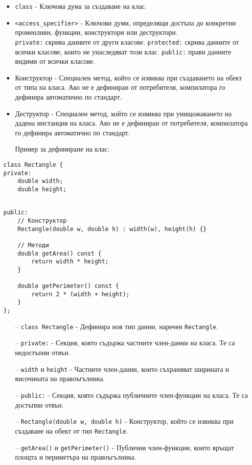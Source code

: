 \documentclass[oneside]{book}
\newcommand*{\code}[1]{\texttt{#1}}
\begin{document}
\begin{itemize}
    \item \code{class} - Ключова дума за създаване на клас.
    \item \code{<access\_specifier>} - Ключови думи, определящи достъпа до конкретни променливи, функции, конструктори или деструктори.\\\code{private:} скрива данните от други класове. \code{protected:} скрива данните от всички класове, които не унаследяват този клас. \code{public:} прави данните видими от всички класове.
    \item Конструктор - Специален метод, който се извиква при създаването на обект от типа на класа. Ако не е дефиниран от потребителя, компилатора го дефинира автоматично по стандарт.
    \item Деструктор - Специален метод, който се извиква при унищожаването на дадена инстанция на класа. Ако не е дефиниран от потребителя, компилатора го дефинира автоматично по стандарт.
\end{itemize}

\begin{itemize}\item[Пример] за дефиниране на клас:\end{itemize}
\begin{mdframed}\begin{lstlisting}
class Rectangle {
private:
    double width;
    double height;
\end{lstlisting}\end{mdframed}
\begin{mdframed}\begin{lstlisting}[firstnumber=last]

public:
    // Конструктор
    Rectangle(double w, double h) : width(w), height(h) {}

    // Методи
    double getArea() const {
        return width * height;
    }

    double getPerimeter() const {
        return 2 * (width + height);
    }
};
\end{lstlisting}\end{mdframed}

\begin{itemize}
    \item[--] \code{class Rectangle} - Дефинира нов тип данни, наречен \code{Rectangle}.
    \item[--] \code{private:} - Секция, която съдържа частните член-данни на класа. Те са недостъпни отвън.
    \item[--] \code{width} и \code{height} - Частните член-данни, които съхраняват ширината и височината на правоъгълника.
    \item[--] \code{public:} - Секция, която съдържа публичните член-функции на класа. Те са достъпни отвън.
    \item[--] \code{Rectangle(double w, double h)} - Конструктор, който се извиква при създаване на обект от тип \code{Rectangle}.
    \item[--] \code{getArea()} и \code{getPerimeter()} - Публични член-функции, които връщат\\площта и периметъра на правоъгълника.
\end{itemize}
\end{document}
